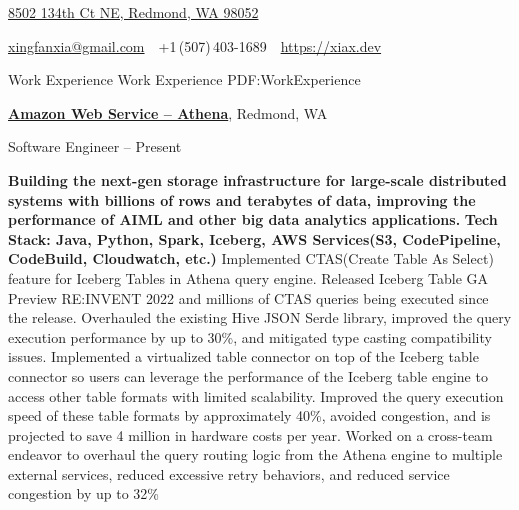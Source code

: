 \documentclass[a4paper,MMMyyyy,nonstopmode]{simpleresumecv}
\newcommand{\CVAuthor}{Xingfan Xia}
\newcommand{\CVWebpage}{https://xiax.dev}
\begin{document}

\Title{\CVAuthor}

\begin{SubTitle}
\href{https://www.google.com/maps/place/8502+134th+Ct+NE,+Redmond,+WA+98052}
{8502 134th Ct NE, Redmond, WA 98052}
\par
\href{mailto:xingfanxia@gmail.com}
{xingfanxia@gmail.com}
\,\SubBulletSymbol\,
+1\,(507)\,403-1689
\,\SubBulletSymbol\,
\href{\CVWebpage}
{\url{\CVWebpage}}
\end{SubTitle}

\begin{Body}

\Section
{Work\newline
Experience}
{Work Experience}
{PDF:WorkExperience}

\Entry
\href{https://aws.amazon.com/athena/}
{\textbf{Amazon Web Service -- Athena}},
Redmond, WA

\Gap
\BulletItem
Software Engineer
\hfill
{} --
Present
\begin{Detail}
\SubBulletItem
\textbf{Building the next-gen storage infrastructure for large-scale distributed systems with billions of rows and terabytes of data, improving the performance of AIML and other big data analytics applications.}
\SubBulletItem \textbf{Tech Stack: Java, Python, Spark, Iceberg, AWS Services(S3, CodePipeline, CodeBuild, Cloudwatch, etc.)}
\SubBulletItem
Implemented CTAS(Create Table As Select) feature for Iceberg Tables in Athena query engine. Released Iceberg Table GA Preview RE:INVENT 2022 and millions of CTAS queries being executed since the release.
\SubBulletItem
Overhauled the existing Hive JSON Serde library, improved the query execution performance by up to 30\%, and mitigated type casting compatibility issues.
\SubBulletItem
Implemented a virtualized table connector on top of the Iceberg table connector so users can leverage the performance of the Iceberg table engine to access other table formats with limited scalability. 
Improved the query execution speed of these table formats by approximately 40\%, avoided congestion, and is projected to save 4 million in hardware costs per year.
\SubBulletItem
Worked on a cross-team endeavor to overhaul the query routing logic from the Athena engine to multiple external services, reduced excessive retry behaviors, and reduced service congestion by up to 32\%
\end{Detail}


\end{Body}
\end{document}
